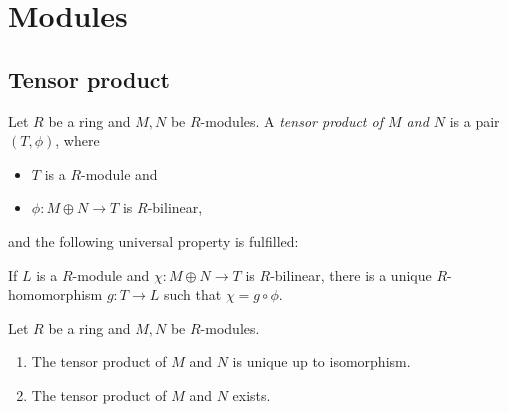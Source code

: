 \section{Modules}
\subsection{Tensor product}
\begin{Definition}
    Let $R$ be a ring and $M, N$ be $R$-modules.
    A \emph{tensor product of $M$ and $N$} is a pair $(T, \phi)$, where
    \begin{itemize}
        \item $T$ is a $R$-module and
        \item $\phi: M \oplus N \to T$ is $R$-bilinear,
    \end{itemize}
    and the following universal property is fulfilled:

    If $L$ is a $R$-module and $\chi: M \oplus N \to T$ is $R$-bilinear, there is a unique $R$-homomorphism 
    $g: T \to L$ such that $\chi = g \circ \phi$.
\end{Definition}

\begin{Lemma}
    Let $R$ be a ring and $M, N$ be $R$-modules.
    \begin{enumerate}
        \item The tensor product of $M$ and $N$ is unique up to isomorphism.
        \item The tensor product of $M$ and $N$ exists.
    \end{enumerate}
\end{Lemma}
